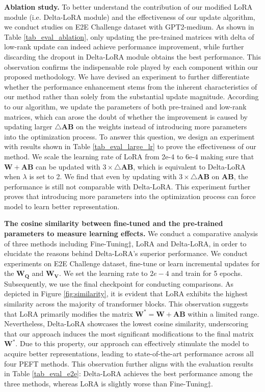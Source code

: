 {\textbf{Ablation study.} To better understand the contribution of our modified LoRA module (i.e. Delta-LoRA module) and the effectiveness of our update algorithm, we conduct studies on E2E Challenge dataset with GPT2-medium. As shown in Table \ref{tab_eval_ablation}, only updating the pre-trained matrices with delta of low-rank update can indeed achieve performance improvement, while further discarding the dropout in Delta-LoRA module obtains the best performance. This observation confirms the indispensable role played by each component within our proposed methodology. We have devised an experiment to further differentiate whether the performance enhancement stems from the inherent characteristics of our method rather than solely from the substantial update magnitude. According to our algorithm, we update the parameters of both pre-trained and low-rank matrices, which can arose the doubt of whether the improvement is caused by updating larger $\triangle\boldsymbol{A}\boldsymbol{B}$ on the weights instead of introducing more parameters into the optimization process. To answer this question, we design an experiment with results shown in Table \ref{tab_eval_large_lr} to prove the effectiveness of our method. We scale the learning rate of LoRA from 2e-4 to 6e-4 making sure that $\boldsymbol{W} + \boldsymbol{A}\boldsymbol{B}$ can be updated with $3\times \triangle\boldsymbol{A}\boldsymbol{B}$, which is equivalent to Delta-LoRA when $\lambda$ is set to 2. We find that even by updating with $3 \times \triangle \boldsymbol{A}\boldsymbol{B}$ on $\boldsymbol{A}\boldsymbol{B}$, the performance is still not comparable with Delta-LoRA. This experiment further proves that introducing more parameters into the optimization process can force model to learn better representation.

\textbf{The cosine similarity between fine-tuned and the pre-trained parameters to measure learning effects.} We conduct a comparative analysis of three methods including Fine-Tuning$\ddag$, LoRA and Delta-LoRA, in order to elucidate the reasons behind Delta-LoRA's superior performance. We conduct experiments on E2E Challenge dataset, fine-tune or learn incremental updates for the $\boldsymbol{W}_{\boldsymbol{Q}}$ and $\boldsymbol{W}_{\boldsymbol{V}}$. We set the learning rate to $2e-4$ and train for 5 epochs. Subsequently, we use the final checkpoint for conducting comparisons. As depicted in Figure \ref{fig:similarity}, it is evident that LoRA exhibits the highest similarity across the majority of transformer blocks. This observation suggests that LoRA primarily modifies the matrix $\boldsymbol{W}^{*}=\boldsymbol{W}+\boldsymbol{A}\boldsymbol{B}$ within a limited range. Nevertheless, Delta-LoRA showcases the lowest cosine similarity, underscoring that our approach induces the most significant modifications to the final matrix $\boldsymbol{W}^{*}$.
Due to this property, our approach can effectively stimulate the model to acquire better representations, leading to state-of-the-art  performance across all four PEFT methods. This observation further aligns with the evaluation results in Table \ref{tab_eval_e2e}: Delta-LoRA achieves the best performance among the three methods, whereas LoRA is slightly worse than Fine-Tuning$\ddag$.

}
